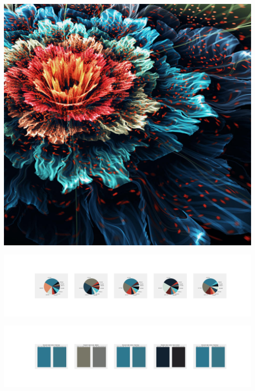 \documentclass[11pt]{article}
\begin{document}
\begin{landscape}
    \begin{center}
    \includegraphics[width=\textwidth]{./nbimg/file (273).jpg}
    \end{center}

    \begin{center}
    \includegraphics[width=250mm]{./nbimg/pie-193.jpg}
    \end{center}

    \begin{center}
    \includegraphics[width=250mm]{./nbimg/peak-193.jpg}
    \end{center}
    


\end{landscape}
\end{document}
